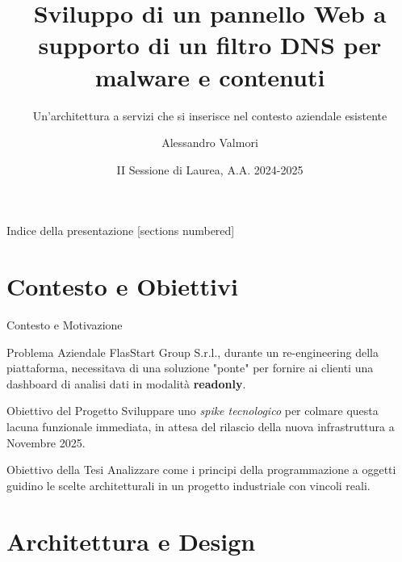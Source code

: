 \documentclass[8pt]{beamer}
\title{Sviluppo di un pannello Web a supporto di un filtro DNS per malware e contenuti}
\subtitle{Un'architettura a servizi che si inserisce nel contesto aziendale esistente}
\date{II Sessione di Laurea, A.A. 2024-2025}
\author{Alessandro Valmori}
\institute{Università di Bologna \and Relatore: Prof. Mirko Viroli \and Correlatore: Dott. Nicolas Farabegoli}
\begin{document}
\maketitle

\begin{frame}{Indice della presentazione}
  [sections numbered]
  \tableofcontents[hideallsubsections]
\end{frame}


\section{Contesto e Obiettivi}

\begin{frame}{Contesto e Motivazione}
  \begin{block}{Problema Aziendale }
    FlasStart Group S.r.l., durante un re-engineering della piattaforma, necessitava di una soluzione "ponte" per fornire ai clienti una dashboard di analisi dati in modalità \textbf{readonly}.
  \end{block}
  \begin{block}{Obiettivo del Progetto }
    Sviluppare uno \textit{spike tecnologico} per colmare questa lacuna funzionale immediata, in attesa del rilascio della nuova infrastruttura a Novembre 2025.
  \end{block}
  \begin{alertblock}{Obiettivo della Tesi }
    Analizzare come i principi della programmazione a oggetti guidino le scelte architetturali in un progetto industriale con vincoli reali.
  \end{alertblock}
\end{frame}

\section{Architettura e Design}
\end{document}

